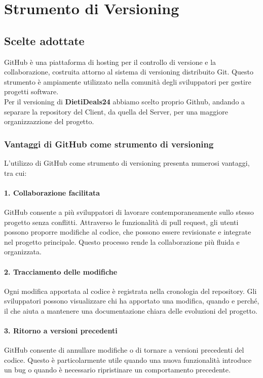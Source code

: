 \chapter{Strumento di Versioning}

\section{Scelte adottate}
GitHub è una piattaforma di hosting per il controllo di versione e la collaborazione, costruita attorno al sistema di versioning distribuito Git. Questo strumento è ampiamente utilizzato nella comunità degli sviluppatori per gestire progetti software.
\\
Per il versioning di \textbf{DietiDeals24} abbiamo scelto proprio Github, andando a separare la repository del Client, da quella del Server, per una maggiore organizzazzione del progetto. 

\subsection{Vantaggi di GitHub come strumento di versioning}

L'utilizzo di GitHub come strumento di versioning presenta numerosi vantaggi, tra cui:

\subsubsection*{1. Collaborazione facilitata}
GitHub consente a più sviluppatori di lavorare contemporaneamente sullo stesso progetto senza conflitti. Attraverso le funzionalità di pull request, gli utenti possono proporre modifiche al codice, che possono essere revisionate e integrate nel progetto principale. Questo processo rende la collaborazione più fluida e organizzata.

\subsubsection*{2. Tracciamento delle modifiche}
Ogni modifica apportata al codice è registrata nella cronologia del repository. Gli sviluppatori possono visualizzare chi ha apportato una modifica, quando e perché, il che aiuta a mantenere una documentazione chiara delle evoluzioni del progetto.

\subsubsection*{3. Ritorno a versioni precedenti}
GitHub consente di annullare modifiche o di tornare a versioni precedenti del codice. Questo è particolarmente utile quando una nuova funzionalità introduce un bug o quando è necessario ripristinare un comportamento precedente.

